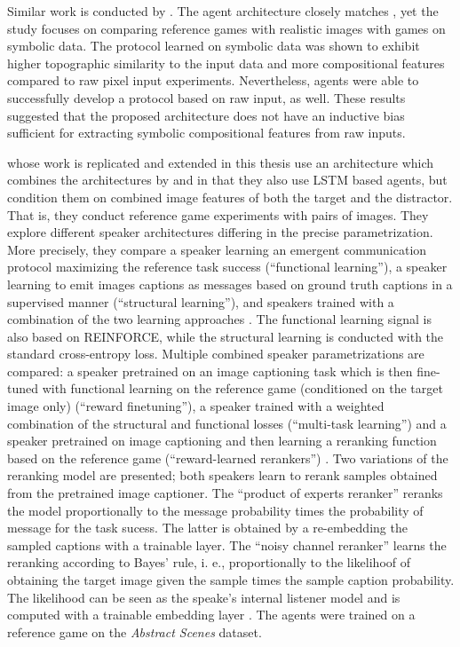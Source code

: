 Similar work is conducted by \cite{lazaridou2018emergence}. The agent architecture closely matches \cite{havrylov2017emergence}, yet the study focuses on comparing reference games with realistic images with games on symbolic data. The protocol learned on symbolic data was shown to exhibit higher topographic similarity to the input data and more compositional features compared to raw pixel input experiments. Nevertheless, agents were able to successfully develop a protocol based on raw input, as well. These results suggested that the proposed architecture does not have an inductive bias sufficient for extracting symbolic compositional features from raw inputs. 

\cite{lazaridou2020multi} whose work is replicated and extended in this thesis use an architecture which combines the architectures by \cite{lazaridou2016multi} and \cite{havrylov2017emergence} in that they also use LSTM based agents, but condition them on combined image features of both the target and the distractor. That is, they conduct reference game experiments with pairs of images. They explore different speaker architectures differing in the precise parametrization. More precisely, they compare a speaker learning an emergent communication protocol maximizing the reference task success (``functional learning''), a speaker learning to emit images captions as messages based on ground truth captions in a supervised manner (``structural learning''), and speakers trained with a combination of the two learning approaches \parencite[][p. 4]{lazaridou2020multi}. The functional learning signal is also based on REINFORCE, while the structural learning is conducted with the standard cross-entropy loss.  Multiple combined speaker parametrizations are compared: a speaker pretrained on an image captioning task which is then fine-tuned with functional learning on the reference game (conditioned on the target image only) (``reward finetuning''), a speaker trained with a weighted combination of the structural and functional losses (``multi-task learning'') and a speaker pretrained on image captioning and then learning a reranking function based on the reference game (``reward-learned rerankers'') \parencite[][p. 4--5]{lazaridou2020multi}. Two variations of the reranking model are presented; both speakers learn to rerank samples obtained from the pretrained image captioner. The ``product of experts reranker'' reranks the model proportionally to the message probability times the probability of message for the task sucess. The latter is obtained by a re-embedding the sampled captions with a trainable layer.  The ``noisy channel reranker'' learns the reranking according to Bayes' rule, i. e., proportionally to the likelihoof of obtaining the target image given the sample times the sample caption probability. The likelihood can be seen as the speake's internal listener model and is computed with a trainable embedding layer \parencite[][p. 5--6]{lazaridou2020multi}. The agents were trained on a reference game on the \textit{Abstract Scenes} dataset.

